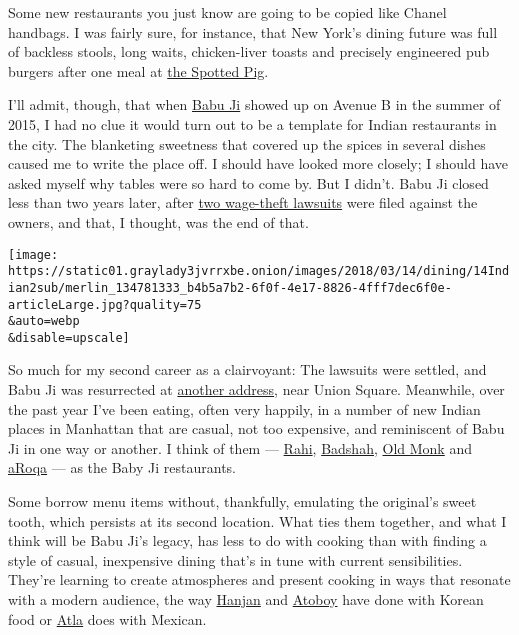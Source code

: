 Some new restaurants you just know are going to be copied like Chanel
handbags. I was fairly sure, for instance, that New York's dining future
was full of backless stools, long waits, chicken-liver toasts and
precisely engineered pub burgers after one meal at
\href{https://www.nytimes3xbfgragh.onion/2006/01/25/dining/reviews/25rest.html}{the
Spotted Pig}.

I'll admit, though, that when
\href{https://www.nytimes3xbfgragh.onion/2015/09/09/dining/hungry-city-babu-ji-east-village.html}{Babu
Ji} showed up on Avenue B in the summer of 2015, I had no clue it would
turn out to be a template for Indian restaurants in the city. The
blanketing sweetness that covered up the spices in several dishes caused
me to write the place off. I should have looked more closely; I should
have asked myself why tables were so hard to come by. But I didn't. Babu
Ji closed less than two years later, after
\href{https://ny.eater.com/2017/3/2/14789116/babu-ji-closing-labor-lawsuits-threats}{two
wage-theft lawsuits} were filed against the owners, and that, I thought,
was the end of that.

\texttt{[image: https://static01.graylady3jvrrxbe.onion/images/2018/03/14/dining/14Indian2sub/merlin\_134781333\_b4b5a7b2-6f0f-4e17-8826-4fff7dec6f0e-articleLarge.jpg?quality=75\\\&auto=webp\\\&disable=upscale]}

So much for my second career as a clairvoyant: The lawsuits were
settled, and Babu Ji was resurrected at
\href{http://www.babujinyc.com/}{another address}, near Union Square.
Meanwhile, over the past year I've been eating, often very happily, in a
number of new Indian places in Manhattan that are casual, not too
expensive, and reminiscent of Babu Ji in one way or another. I think of
them --- \href{https://www.rahinyc.com/}{Rahi},
\href{http://badshahny.com/}{Badshah}, \href{http://oldmonknyc.com/}{Old
Monk} and \href{https://www.aroqanyc.com/}{aRoqa} --- as the Baby Ji
restaurants.

Some borrow menu items without, thankfully, emulating the original's
sweet tooth, which persists at its second location. What ties them
together, and what I think will be Babu Ji's legacy, has less to do with
cooking than with finding a style of casual, inexpensive dining that's
in tune with current sensibilities. They're learning to create
atmospheres and present cooking in ways that resonate with a modern
audience, the way
\href{https://www.nytimes3xbfgragh.onion/2013/04/03/dining/reviews/restaurant-review-hanjan-in-manhattan.html}{Hanjan}
and
\href{https://www.nytimes3xbfgragh.onion/2017/05/09/dining/atoboy-review-korean-restaurant-nyc.html}{Atoboy}
have done with Korean food or
\href{https://www.nytimes3xbfgragh.onion/2017/07/25/dining/atla-review-mexican-restaurant-noho.html}{Atla}
does with Mexican.

